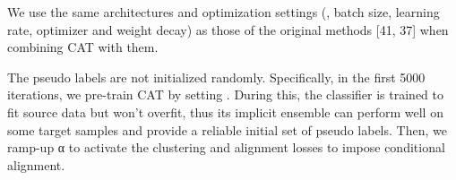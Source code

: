 \documentclass[10pt,twocolumn,letterpaper]{article}
\begin{document}
We use the same architectures and optimization settings (\eg, batch size, learning rate, optimizer and weight decay) as those of the original methods [41, 37] when combining CAT with them.

The pseudo labels are not initialized randomly. Specifically, in the first 5000 iterations, we pre-train CAT by setting . During this, the classifier is trained to fit source data but won't overfit, thus its implicit ensemble can perform well on some target samples and provide a reliable initial set of pseudo labels. Then, we ramp-up α to activate the clustering and alignment losses to impose conditional alignment.
\end{document}
